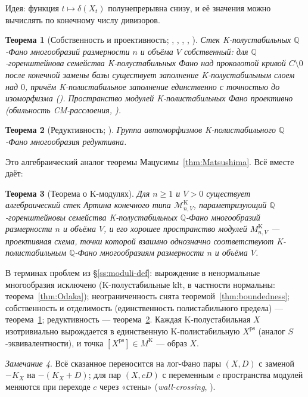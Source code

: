 \documentclass[11pt,a4paper]{article}
\theoremstyle{plain}
\newtheorem{theorem}{Теорема}[section]
\theoremstyle{definition}
\theoremstyle{remark}
\newtheorem{remark}[theorem]{Замечание}
\newcommand{\Q}{\mathbb{Q}}
\newcommand{\cM}{\mathcal{M}}
\begin{document}
Идея: функция $t\mapsto\delta(X_t)$ полунепрерывна снизу, и её значения можно вычислять по
конечному числу дивизоров.

\begin{theorem}[{Собственность и проективность; \cite{LWX}, \cite{BX}, \cite{BHLLX}, \cite{LXZ}, \cite{XZ}}]\label{thm:properness}
Стек K-полустабильных $\Q$-Фано многообразий размерности $n$ и объёма $V$ собственный: для
$\Q$-горенштейнова семейства K-полустабильных Фано над проколотой кривой $C\setminus0$ после
конечной замены базы существует заполнение K-полустабильным слоем над $0$, причём K-полистабильное
заполнение единственно с точностью до изоморфизма (\cite{BX}). Пространство модулей
K-полистабильных Фано проективно (обильность CM-расслоения, \cite{XZ}).
\end{theorem}

\begin{theorem}[{Редуктивность; \cite{ABHLX}}]\label{thm:reductivity}
Группа автоморфизмов K-полистабильного $\Q$-Фано многообразия редуктивна.
\end{theorem}

Это алгебраический аналог теоремы Мацусимы~\ref{thm:Matsushima}. Всё вместе даёт:

\begin{theorem}[Теорема о K-модулях]\label{thm:Kmoduli}
Для $n\ge1$ и $V>0$ существует алгебраический стек Артина конечного типа $\cM^{\mathrm{K}}_{n,V}$,
параметризующий $\Q$-горенштейновы семейства K-полустабильных $\Q$-Фано многообразий размерности
$n$ и объёма $V$, и его хорошее пространство модулей $M^{\mathrm{K}}_{n,V}$ --- проективная схема,
точки которой взаимно однозначно соответствуют K-полистабильным $\Q$-Фано многообразиям размерности
$n$ и объёма $V$.
\end{theorem}

В терминах проблем из \S\ref{ss:moduli-def}: вырождение в ненормальные многообразия исключено
(K-полустабильные klt, в частности нормальны: теорема~\ref{thm:Odaka}); неограниченность снята
теоремой~\ref{thm:boundedness}; собственность и отделимость (единственность полистабильного предела)
--- теорема~\ref{thm:properness}; редуктивность --- теорема~\ref{thm:reductivity}. Каждая
K-полустабильная $X$ изотривиально вырождается в единственную K-полистабильную $X^{\mathrm{ps}}$
(аналог $S$-эквивалентности), и точка $[X^{\mathrm{ps}}]\in M^{\mathrm{K}}$ --- образ $X$.

\begin{remark}
Всё сказанное переносится на лог-Фано пары $(X,D)$ с заменой $-K_X$ на $-(K_X+D)$; для пар
$(X,cD)$ с переменным $c$ пространства модулей меняются при переходе $c$ через «стены»
(\emph{wall-crossing}, \cite{ADL}).
\end{remark}
\end{document}
